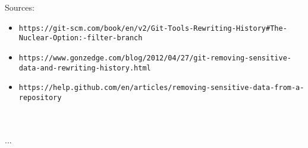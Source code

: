\documentclass[11pt,twoside,a4paper]{article}
\begin{document}
\begin{landscape}
\begin{multicols}{2}
Sources: 
\begin{itemize}
	\item \texttt{\footnotesize https://git-scm.com/book/en/v2/Git-Tools-Rewriting-History\#The-Nuclear-Option:-filter-branch}
	\item \texttt{\footnotesize https://www.gonzedge.com/blog/2012/04/27/git-removing-sensitive-data-and-rewriting-history.html}
	\item \texttt{\footnotesize https://help.github.com/en/articles/removing-sensitive-data-from-a-repository}
\end{itemize}~\\

	\vfill~\\
	
	...
\end{multicols}

\clearpage

\end{landscape}
\end{document}
